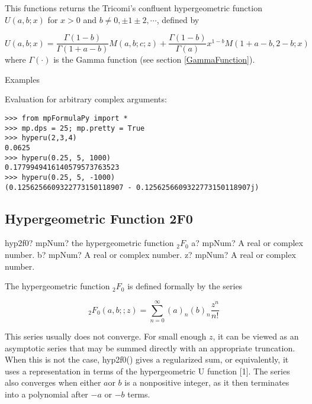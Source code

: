 \vspace{0.3cm}
This functions returns the Tricomi's confluent hypergeometric function $U(a, b; x)$ for $x>0$ and $b \neq 0, \pm1 \pm2, \cdots$,  defined by  

\begin{equation}
U(a,b;x) = \frac{\Gamma(1-b)}{\Gamma(1+a-b)} M(a,b;c;z) + \frac{\Gamma(1-b)}{\Gamma(a)} x^{1-b} M(1+a-b,2-b;x) 
\end{equation}
where $\Gamma(\cdot)$ is the Gamma function (see section \ref{GammaFunction}).




Examples

Evaluation for arbitrary complex arguments:

\begin{lstlisting}
>>> from mpFormulaPy import *
>>> mp.dps = 25; mp.pretty = True
>>> hyperu(2,3,4)
0.0625
>>> hyperu(0.25, 5, 1000)
0.1779949416140579573763523
>>> hyperu(0.25, 5, -1000)
(0.1256256609322773150118907 - 0.1256256609322773150118907j)
\end{lstlisting}



\subsection{Hypergeometric Function 2F0}

\begin{mpFunctionsExtract}
	\mpFunctionThree
	{hyp2f0? mpNum? the hypergeometric function ${}_2F_0$}
	{a? mpNum? A real or complex number.}
	{b? mpNum? A real or complex number.}	
	{z? mpNum? A real or complex number.}		
\end{mpFunctionsExtract}

\vpara
The hypergeometric function ${}_2F_0$ is defined formally by the series

\begin{equation}
{}_2F_0(a,b;;z) = \sum_{n=0}^{\infty}(a)_n (b)_n \frac{z^n}{n!}
\end{equation}

This series usually does not converge. For small enough $z$, it can be viewed as an asymptotic series that may be summed directly with an appropriate truncation. When this is not the case, hyp2f0() gives a regularized sum, or equivalently, it uses a representation in terms of the hypergeometric U function [1]. The series also converges when either $a$or $b$ is a nonpositive integer, as it then terminates into a polynomial after $-a$ or $-b$ terms.

